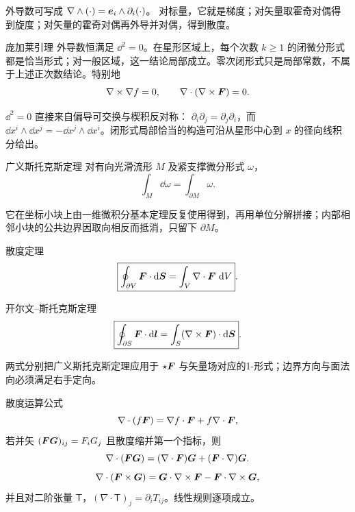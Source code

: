 外导数可写成 $\nabla\wedge(\cdot)=\bm{e}_i\wedge\partial_i(\cdot)$。
对标量，它就是梯度；对矢量取霍奇对偶得到旋度；对矢量的霍奇对偶再外导并对偶，得到散度。

\begin{advtheorem}{庞加莱引理}\label{advA3:thm:poincare}
外导数恒满足 $\dd^2=0$。在星形区域上，每个次数 $k\ge1$ 的闭微分形式都是恰当形式；对一般区域，这一结论局部成立。零次闭形式只是局部常数，不属于上述正次数结论。特别地
\[
 \nabla\times\nabla f=0,
 \qquad
 \nabla\cdot(\nabla\times\bm{F})=0.
\]
\end{advtheorem}
$\dd^2=0$ 直接来自偏导可交换与楔积反对称：
$\partial_i\partial_j=\partial_j\partial_i$，而
$\dd x^i\wedge\dd x^j=-\dd x^j\wedge\dd x^i$。闭形式局部恰当的构造可沿从星形中心到 $x$ 的径向线积分给出。

\begin{advtheorem}{广义斯托克斯定理}\label{advA3:thm:general-stokes}
对有向光滑流形 $M$ 及紧支撑微分形式 $\omega$，
\[
 \boxed{\int_M\dd\omega=\int_{\partial M}\omega}.
\]
\end{advtheorem}
它在坐标小块上由一维微积分基本定理反复使用得到，再用单位分解拼接；内部相邻小块的公共边界因取向相反而抵消，只留下 $\partial M$。

\begin{advtheorem}{散度定理}\label{advA3:thm:divergence-theorem}
\[
 \boxed{\oint_{\partial V}\bm{F}\cdot\mathop{}\!\mathrm d\bm{S}
 =\int_V\nabla\cdot\bm{F}\,\mathop{}\!\mathrm d V}.
\]
\end{advtheorem}

\begin{advtheorem}{开尔文--斯托克斯定理}\label{advA3:thm:curl-stokes}
\[
 \boxed{\oint_{\partial S}\bm{F}\cdot\mathop{}\!\mathrm d\bm{l}
 =\int_S(\nabla\times\bm{F})\cdot\mathop{}\!\mathrm d\bm{S}}.
\]
\end{advtheorem}
两式分别把广义斯托克斯定理应用于 $\star\bm{F}$ 与矢量场对应的1-形式；边界方向与面法向必须满足右手定向。

\begin{advtheorem}{散度运算公式}\label{advA3:thm:divergence-rules}
\[
 \nabla\cdot(f\bm{F})=\nabla f\cdot\bm{F}+f\nabla\cdot\bm{F},
\]
若并矢 $(\bm{F}\bm{G})_{ij}=F_iG_j$ 且散度缩并第一个指标，则
\[
 \nabla\cdot(\bm{F}\bm{G})
 =(\nabla\cdot\bm{F})\bm{G}+(\bm{F}\cdot\nabla)\bm{G}.
\]
\[
 \nabla\cdot(\bm{F}\times\bm{G})
 =\bm{G}\cdot\nabla\times\bm{F}-\bm{F}\cdot\nabla\times\bm{G},
\]
并且对二阶张量 $\mathsf T$，$(\nabla\cdot\mathsf T)_j=\partial_iT_{ij}$。线性规则逐项成立。
\end{advtheorem}

